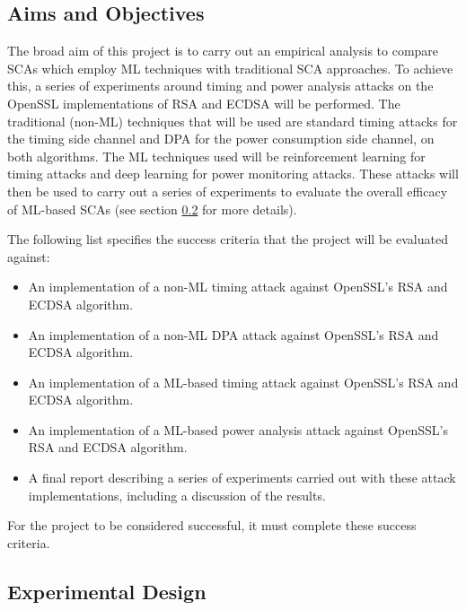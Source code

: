 \documentclass[a4paper,oneside,11pt]{article}
\begin{document}

\subsection{Aims and Objectives}
\label{sec:aims-and-objectives}

The broad aim of this project is to carry out an empirical analysis to compare
SCAs which employ ML techniques with traditional SCA approaches. To achieve
this, a series of experiments around timing and power analysis attacks on the
OpenSSL \cite{W/OpenSSL} implementations of RSA \cite{A/Rivest-1978-RSA} and
ECDSA \cite{A/Johnson-2001-ECDSA} will be performed. The traditional (non-ML)
techniques that will be used are standard timing attacks for the timing side
channel and DPA for the power consumption side channel, on both algorithms. The
ML techniques used will be reinforcement learning for timing attacks and deep
learning for power monitoring attacks. These attacks will then be used to carry
out a series of experiments to evaluate the overall efficacy of ML-based SCAs
(see section \ref{sec:experimental-design} for more details).

The following list specifies the success criteria that the project will be
evaluated against:

\begin{itemize}
	\item{An implementation of a non-ML timing attack against OpenSSL's
		RSA and ECDSA algorithm.}
	\item{An implementation of a non-ML DPA attack against OpenSSL's
		RSA and ECDSA algorithm.}
	\item{An implementation of a ML-based timing attack against OpenSSL's
		RSA and ECDSA algorithm.}
	\item{An implementation of a ML-based power analysis attack against
		OpenSSL's RSA and ECDSA algorithm.}
	\item{A final report describing a series of experiments carried out
		with these attack implementations, including a discussion of
		the results.}
\end{itemize}

For the project to be considered successful, it must complete these success
criteria.



\subsection{Experimental Design}
\label{sec:experimental-design}
\end{document}

